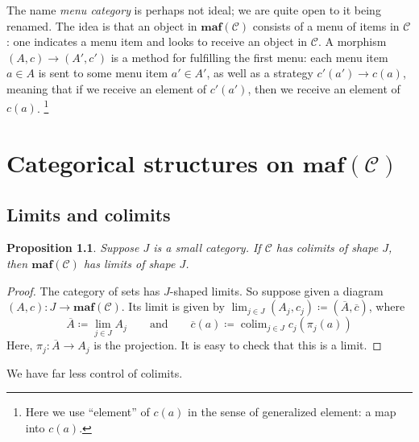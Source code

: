 \documentclass[11pt, one side, article]{memoir}
\theoremstyle{definition}
\theoremstyle{plain}
\newtheorem{proposition}[definitionx]{Proposition}
\DeclareMathOperator*{\colim}{colim}
\newcommand{\cat}[1]{\mathcal{#1}}%
\newcommand{\Cat}[1]{\mathbf{#1}}%
\newcommand{\ol}[1]{\overline{#1}}
\newcommand{\0}{\Cat{0}}
\newcommand{\1}{\Cat{1}}
\newcommand{\opfam}{\Cat{maf}}
\newcommand{\qqand}{\qquad\text{and}\qquad}
\begin{document}
The name \emph{menu category} is perhaps not ideal; we are quite open to it being renamed. The idea is that an object in $\opfam(\cat{C})$ consists of a menu of items in $\cat{C}$: one indicates a menu item and looks to receive an object in $\cat{C}$. A morphism $(A,c)\to (A',c')$ is a method for fulfilling the first menu: each menu item $a\in A$ is sent to some menu item $a'\in A'$, as well as a strategy $c'(a')\to c(a)$, meaning that if we receive an element of $c'(a')$, then we receive an element of $c(a)$.%
\footnote{Here we use ``element'' of $c(a)$ in the sense of generalized element: a map into $c(a)$.}






\chapter{Categorical structures on $\opfam(\cat{C})$}

\section{Limits and colimits}

\begin{proposition}\label{prop.colimits_to_limits}
Suppose $J$ is a small category. If $\cat{C}$ has colimits of shape $J$, then $\opfam(\cat{C})$ has limits of shape $J$.
\end{proposition}
\begin{proof}
	The category of sets has $J$-shaped limits. So suppose given a diagram $(A,c)\colon J\to \opfam(\cat{C})$. Its limit is given by $\lim_{j\in J}(A_j,c_j)\coloneqq(\ol{A},\ol{c})$, where
	\[
	\ol{A}\coloneqq\lim_{j\in J}A_j
	\qqand
	\ol{c}(a)\coloneqq\colim_{j\in J}c_j(\pi_j(a))
	\]
	Here, $\pi_j\colon \ol{A}\to A_j$ is the projection. It is easy to check that this is a limit.
\end{proof}

We have far less control of colimits.
\end{document}
